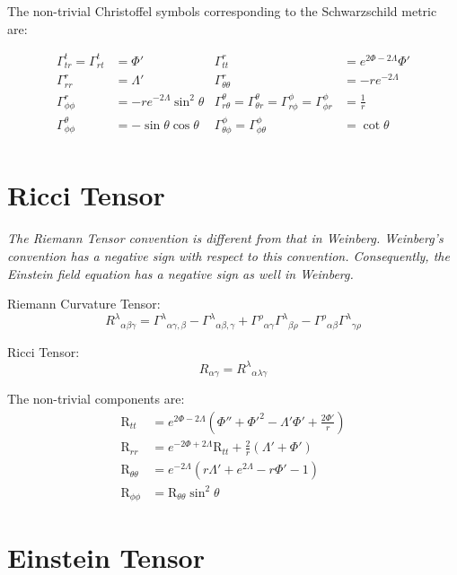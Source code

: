 \documentclass[12pt, letterpaper]{report}
\begin{document}
The non-trivial Christoffel symbols corresponding to the Schwarzschild metric are: 

\begin{align*}
    \Gamma ^{t}_{tr}= \Gamma ^{t}_{rt} &= \Phi ' &
    \Gamma ^r_{tt} &= e^{2 \Phi-2 \Lambda} \Phi '\\
    \Gamma ^r_{rr} &= \Lambda '&
    \Gamma ^r_{\theta \theta} &= -re^{-2 \Lambda}\\
    \Gamma ^r_{\phi\phi} &= -re^{-2 \Lambda} \sin ^2\theta &
    \Gamma ^{\theta}_{r\theta}=\Gamma ^{\theta}_{\theta r}=\Gamma ^{\phi }_{r\phi }= \Gamma ^{\phi }_{\phi r} &= \frac{1}{r}\\
    \Gamma ^{\theta }_{\phi\phi }&= -\sin \theta \cos \theta &
    \Gamma ^{\phi }_{\theta\phi }= \Gamma ^{\phi }_{\phi \theta} &= \cot \theta\\
\end{align*}

\section{Ricci Tensor}

\emph{The Riemann Tensor convention is different from that in Weinberg. Weinberg's convention has a negative sign with respect to this convention. Consequently, the Einstein field equation has a negative sign as well in Weinberg.}

Riemann Curvature Tensor: 
$$R^{\lambda }{}_{\alpha \beta \gamma }=\Gamma ^{\lambda }{}_{\alpha \gamma ,\beta }- \Gamma ^{\lambda }{}_{\alpha \beta ,\gamma }+\Gamma ^{\rho }{}_{\alpha \gamma } \Gamma ^{\lambda }{}_{\beta \rho }- \Gamma ^{\rho }{}_{\alpha \beta } \Gamma ^{\lambda }{}_{\gamma \rho }$$

Ricci Tensor: 
$$R_{\alpha \gamma }=R^{\lambda }{}_{\alpha \lambda \gamma }$$

The non-trivial components are: 
\begin{align*}
    \text{R}_{tt} &= e^{2 \Phi-2 \Lambda} \left(\Phi ''+\Phi '^2-  \Lambda '\Phi ' +\frac{2\Phi '}{r} \right)\\
    \text{R}_{rr}&= e^{-2 \Phi+2 \Lambda}\text{R}_{tt}+ \frac{2}{r}\left(\Lambda'+ \Phi '\right)\\
    \text{R}_{\theta \theta }&=e^{-2 \Lambda } \left(r \Lambda '+e^{2 \Lambda }-r \Phi '-1\right)\\
    \text{R}_{\phi \phi } &= \text{R}_{\theta\theta }\sin ^2\theta
\end{align*}

\section{Einstein Tensor}
\end{document}
